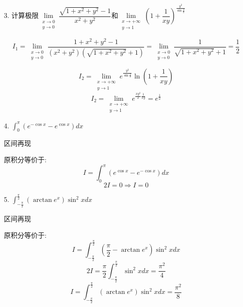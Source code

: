 
3. 计算极限$\lim\limits_{\substack{x\rightarrow 0\\ y\rightarrow 0}}\dfrac{\sqrt{1+x^2+y^2}-1}{x^2+y^2}$和$\lim\limits_{\substack{x\rightarrow +\infty\\ y\rightarrow 1}}\left( 1+\dfrac{1}{xy}\right)^{\frac{y^2}{\sin\frac{2}{x}}} $
\begin{solution}
	$$I_{1}=\lim\limits_{\substack{x\rightarrow 0\\ y\rightarrow 0}}\dfrac{1+x^2+y^2-1}{(x^2+y^2)(\sqrt{1+x^2+y^2}+1)}=\lim\limits_{\substack{x\rightarrow 0\\ y\rightarrow 0}}\dfrac{1}{\sqrt{1+x^2+y^2}+1}=\frac{1}{2}$$
	
	$$I_{2}=\lim\limits_{\substack{x\rightarrow +\infty\\ y\rightarrow 1}}e^{\frac{y^2}{\sin\frac{2}{x}}}\ln(1+\frac{1}{xy})$$
	$$I_{2}=\lim\limits_{\substack{x\rightarrow +\infty\\ y\rightarrow 1}}e^{\frac{xy^2}{2}\frac{1}{xy}}=e^{\frac{1}{2}}$$
\end{solution}


4. $\int_{0}^{\pi}\left( e^{-\cos x}-e^{\cos x}\right)dx $
\begin{solution}
	
	区间再现
	
	原积分等价于: 
	$$I=\int_{0}^{\pi}\left( e^{\cos x}-e^{-\cos x}\right)dx$$
	$$2I=0\Rightarrow I=0$$
\end{solution}


5. $\int_{-\frac{\pi}{2}}^{\frac{\pi}{2}}\left( \arctan e^{x}\right)\sin^{2}xdx $
\begin{solution}
	
	区间再现
	
	原积分等价于: 
	$$I=\int_{-\frac{\pi}{2}}^{\frac{\pi}{2}}(\frac{\pi}{2}-\arctan e^{x})\sin^{2}xdx$$
	$$2I=\frac{\pi}{2}\int_{-\frac{\pi}{2}}^{\frac{\pi}{2}}\sin^{2}xdx=\frac{\pi^{2}}{4}$$
	$$I=\int_{-\frac{\pi}{2}}^{\frac{\pi}{2}}\left( \arctan e^{x}\right)\sin^{2}xdx=\frac{\pi^{2}}{8}$$
\end{solution}


